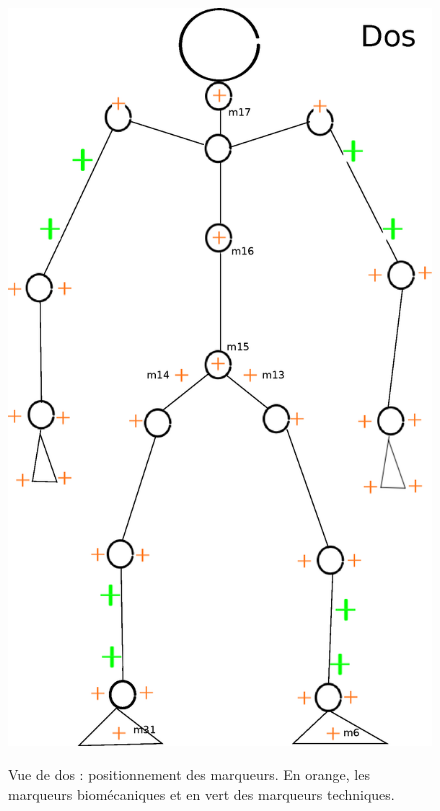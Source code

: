 \documentclass[a4paper, 10pt ]{article}
\begin{document}
\begin{figure}
\includegraphics[width=0.7\columnwidth]{images/modeleHommeDos.eps}
\label{fig:marqueursDos}
\caption{Vue de dos : positionnement des marqueurs. En orange, les marqueurs biomécaniques et en vert des marqueurs techniques.}
\end{figure}
\end{document}
